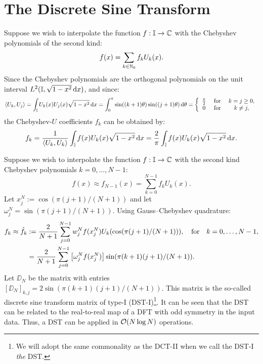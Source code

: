\section{The Discrete Sine Transform}

Suppose we wish to interpolate the function $f:\mathbb{I}\to\mathbb{C}$ with the Chebyshev polynomials of the second kind:
\begin{equation}
f(x) = \sum_{k\in\mathbb{N}_0} f_k U_k(x).
\end{equation}
Since the Chebyshev polynomials are the orthogonal polynomials on the unit interval $L^2(\mathbb{I},\sqrt{1-x^2}{\rm\,d} x)$, and since:
\begin{equation}
\langle U_k, U_j\rangle = \int_{\mathbb{I}} U_k(x)U_j(x)\sqrt{1-x^2}{\rm\,d} x = \int_0^\pi \sin((k+1)\theta)\sin((j+1)\theta){\rm\,d}\theta = \left\{\begin{array}{ccc} \frac{\pi}{2} & \hbox{ for } & k = j \ge 0,\\
0 & \hbox{ for } & k \ne j,
\end{array}\right.
\end{equation}
the Chebyshev-$U$ coefficients $f_k$ can be obtained by:
\begin{equation}
f_k = \dfrac{1}{\langle U_k,U_k\rangle}\int_{\mathbb{I}} f(x)U_k(x)\sqrt{1-x^2}{\rm\,d} x = \dfrac{2}{\pi}\int_{\mathbb{I}} f(x)U_k(x)\sqrt{1-x^2}{\rm\,d} x.
\end{equation}

Suppose we wish to interpolate the function $f:\mathbb{I}\to\mathbb{C}$ with the second kind Chebyshev polynomials $k=0,\ldots,N-1$:
\begin{equation}
f(x) \approx f_{N-1}(x) = \sum_{k=0}^{N-1} f_k U_k(x).
\end{equation}
Let $x_j^N := \cos(\pi(j+1)/(N+1))$ and let $\omega_j^N = \sin(\pi(j+1)/(N+1))$. Using Gauss--Chebyshev quadrature:
\begin{align}
f_k \approx \hat{f}_k & := \dfrac{2}{N+1}\sum_{j=0}^{N-1} w_j^Nf(x_j^N)U_k(\cos(\pi (j+1)/(N+1))),\quad{\rm for}\quad k=0,\ldots,N-1,\\
& = \dfrac{2}{N+1}\sum_{j=0}^{N-1} \left[\omega_j^Nf(x_j^N)\right]\sin(\pi (k+1)(j+1)/(N+1)).
\end{align}
Let $\DD_N$ be the matrix with entries $[\DD_N]_{k,j} = 2\sin(\pi (k+1)(j+1)/(N+1))$. This matrix is the so-called discrete sine transform matrix of type-I (DST-I)\footnote{We will adopt the same commonality as the DCT-II when we call the DST-I {\em the} DST.}. It can be seen that the DST can be related to the real-to-real map of a DFT with odd symmetry in the input data. Thus, a DST can be applied in $\mathcal{O}(N\log N)$ operations.

